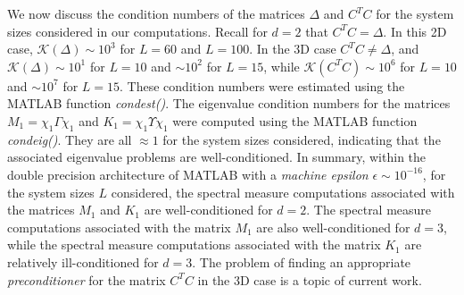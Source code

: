 \documentclass{cmslatex}
\begin{document}
We now discuss the condition numbers of the matrices $\Delta$ and $C^TC$ for
the system sizes considered in our computations. Recall for $d=2$ that
$C^TC=\Delta$. In this 2D case, $\mathcal{K}(\Delta)\sim10^3$ for 
$L=60$ and $L=100$. 
In the 3D case $C^TC\neq\Delta$, and  
$\mathcal{K}(\Delta)\sim10^1$ for $L=10$ and $\sim10^2$ for $L=15$,
while $\mathcal{K}(C^TC)\sim10^6$ for $L=10$ and $\sim10^7$ for $L=15$.
These condition numbers were    
estimated using the MATLAB function \emph{condest()}. The eigenvalue
condition numbers for the matrices $M_1=\chi_1\Gamma\chi_1$ and $K_1=\chi_1\Upsilon\chi_1$
were computed using the MATLAB function \emph{condeig()}. They are all
$\approx1$ for the system sizes considered, indicating that the associated
eigenvalue problems are well-conditioned. In
summary, within the double precision architecture of MATLAB with a
\emph{machine epsilon} $\epsilon\sim10^{-16}$, for the system sizes $L$
considered, the spectral measure computations associated with the
matrices $M_1$ and $K_1$ are well-conditioned for
$d=2$. The spectral measure computations associated with the matrix
$M_1$ are also well-conditioned for $d=3$, while the spectral
measure computations associated with the matrix $K_1$ are
relatively ill-conditioned for $d=3$. The problem of finding an
appropriate \emph{preconditioner} for the matrix $C^TC$ in the 3D case
is a topic of current work.  



 
\end{document}
